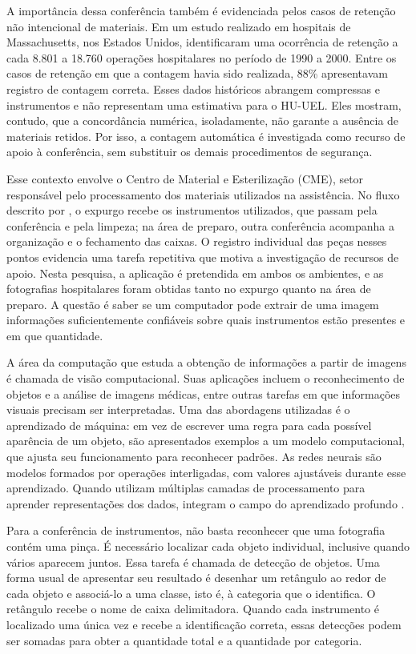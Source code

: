 A importância dessa conferência também é evidenciada pelos casos de retenção não intencional de materiais. Em um estudo realizado em hospitais de Massachusetts, nos Estados Unidos, \textcite{gawande2003} identificaram uma ocorrência de retenção a cada 8.801 a 18.760 operações hospitalares no período de 1990 a 2000. Entre os casos de retenção em que a contagem havia sido realizada, 88\% apresentavam registro de contagem correta. Esses dados históricos abrangem compressas e instrumentos e não representam uma estimativa para o HU-UEL. Eles mostram, contudo, que a concordância numérica, isoladamente, não garante a ausência de materiais retidos. Por isso, a contagem automática é investigada como recurso de apoio à conferência, sem substituir os demais procedimentos de segurança.

Esse contexto envolve o Centro de Material e Esterilização (CME), setor responsável pelo processamento dos materiais utilizados na assistência. No fluxo descrito por \textcite{moreto2025}, o expurgo recebe os instrumentos utilizados, que passam pela conferência e pela limpeza; na área de preparo, outra conferência acompanha a organização e o fechamento das caixas. O registro individual das peças nesses pontos evidencia uma tarefa repetitiva que motiva a investigação de recursos de apoio. Nesta pesquisa, a aplicação é pretendida em ambos os ambientes, e as fotografias hospitalares foram obtidas tanto no expurgo quanto na área de preparo. A questão é saber se um computador pode extrair de uma imagem informações suficientemente confiáveis sobre quais instrumentos estão presentes e em que quantidade.

A área da computação que estuda a obtenção de informações a partir de imagens é chamada de visão computacional. Suas aplicações incluem o reconhecimento de objetos e a análise de imagens médicas, entre outras tarefas em que informações visuais precisam ser interpretadas. Uma das abordagens utilizadas é o aprendizado de máquina: em vez de escrever uma regra para cada possível aparência de um objeto, são apresentados exemplos a um modelo computacional, que ajusta seu funcionamento para reconhecer padrões. As redes neurais são modelos formados por operações interligadas, com valores ajustáveis durante esse aprendizado. Quando utilizam múltiplas camadas de processamento para aprender representações dos dados, integram o campo do aprendizado profundo \parencite{goodfellow2016}.

Para a conferência de instrumentos, não basta reconhecer que uma fotografia contém uma pinça. É necessário localizar cada objeto individual, inclusive quando vários aparecem juntos. Essa tarefa é chamada de detecção de objetos. Uma forma usual de apresentar seu resultado é desenhar um retângulo ao redor de cada objeto e associá-lo a uma classe, isto é, à categoria que o identifica. O retângulo recebe o nome de caixa delimitadora. Quando cada instrumento é localizado uma única vez e recebe a identificação correta, essas detecções podem ser somadas para obter a quantidade total e a quantidade por categoria.

